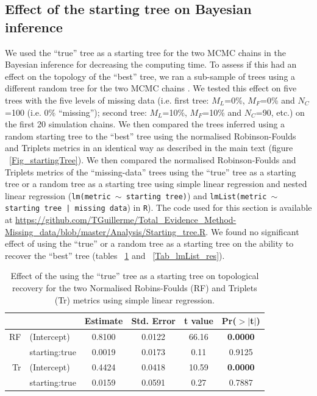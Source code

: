 \documentclass[12pt,letterpaper]{article}
\begin{document}
\subsection{Effect of the starting tree on Bayesian inference}
We used the ``true'' tree as a starting tree for the two MCMC chains in the Bayesian inference for decreasing the computing time.
To assess if this had an effect on the topology of the ``best'' tree, we ran a sub-sample of trees using a different random tree for the two MCMC chains \citep[default MrBayes option;][]{Ronquist2012mrbayes}.
We tested this effect on five trees with the five levels of missing data (i.e. first tree: $M_L$=0\%, $M_F$=0\% and $N_C$=100 (i.e. 0\% ``missing''); second tree: $M_L$=10\%, $M_F$=10\% and $N_C$=90, etc.) on the first 20 simulation chains.
We then compared the trees inferred using a random starting tree to the ``best'' tree using the normalised Robinson-Foulds and Triplets metrics in an identical way as described in the main text (figure ~\ref{Fig_startingTree}).
We then compared the normalised Robinson-Foulds and Triplets metrics of the ``missing-data'' trees using the ``true'' tree as a starting tree or a random tree as a starting tree using simple linear regression and nested linear regression (\texttt{lm(metric $\sim$ starting tree)}) and \texttt{lmList(metric $\sim$ starting tree | missing data}) in \texttt{R}).
The code used for this section is available at \url{https://github.com/TGuillerme/Total_Evidence_Method-Missing_data/blob/master/Analysis/Starting_tree.R}.
We found no significant effect of using the ``true'' or a random tree as a starting tree on the ability to recover the ``best'' tree (tables ~\ref{Tab_lm_res} and ~\ref{Tab_lmList_res}).

\begin{table}[ht]
\caption{Effect of the using the ``true'' tree as a starting tree on topological recovery for the two Normalised Robins-Foulds (RF) and Triplets (Tr) metrics using simple linear regression.}
\label{Tab_lm_res}
\centering
\begin{tabular}{rlcccc}
  \hline
 & & Estimate & Std. Error & t value & Pr($>$$|$t$|$) \\ 
  \hline
RF & (Intercept) & 0.8100 & 0.0122 & 66.16 & \textbf{0.0000} \\ 
   & starting:true & 0.0019 & 0.0173 & 0.11 & 0.9125 \\
Tr & (Intercept) & 0.4424 & 0.0418 & 10.59 & \textbf{0.0000} \\ 
   & starting:true & 0.0159 & 0.0591 & 0.27 & 0.7887 \\ 
   \hline
\end{tabular}
\end{table}
\end{document}

